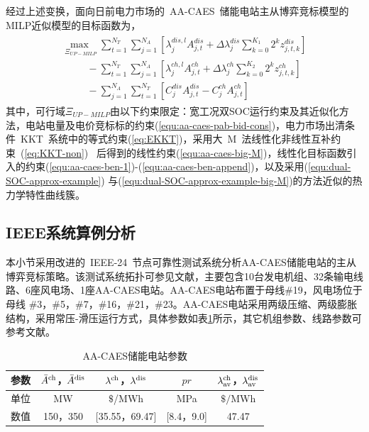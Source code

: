 经过上述变换，面向日前电力市场的~AA-CAES~储能电站主从博弈竞标模型的MILP近似模型的目标函数为，
\begin{eqnarray}
\begin{array}{l}
\mathop {\max \;}\limits_{\Xi_{UP-MILP}} \sum\limits_{t = 1}^{{N_T}} {\sum\limits_{j = 1}^{{N_A}} {[{\lambda _j^{dis,l}A_{j,t}^{dis} + \Delta \lambda _j^{dis}\sum\limits_{k = 0}^{{K_1}} {{2^k}} z_{j,t,k}^{dis}}]} } \\
\;\;\;\;\;\;\;\;\; - \sum\limits_{t = 1}^{{N_T}} {\sum\limits_{j = 1}^{{N_A}} {[{\lambda _j^{ch,l}A_{j,t}^{ch} + \Delta \lambda _j^{ch}\sum\limits_{k = 0}^{{K_2}} {{2^k}} z_{j,t,k}^{ch}}]} } \\
\;\;\;\;\;\;\;\;\; - \sum\limits_{j = 1}^{{N_A}} {\sum\limits_{t = 1}^{{N_T}} {[{C_j^{dis}A_{j,t}^{dis} - C_j^{ch}A_{j,t}^{ch}}]} }
\end{array}
\end{eqnarray}
其中，可行域$\Xi_{UP-MILP}$由以下约束限定：宽工况双SOC运行约束及其近似化方法，电站电量及电价竞标标的约束(\ref{equ:aa-caes-pab-bid-cons})，电力市场出清条件~KKT~系统中的等式约束(\ref{eq:EKKT})，采用大~M~法线性化非线性互补约束~(\ref{eq:KKT-non})~ 后得到的线性约束(\ref{equ:aa-caes-big-M})，线性化目标函数引入的约束(\ref{equ:aa-caes-ben-1})-(\ref{equ:aa-caes-ben-append})，以及采用(\ref{equ:dual-SOC-approx-example}) 与(\ref{equ:dual-SOC-approx-example-big-M})的方法近似的热力学特性曲线簇。

\subsection{IEEE系统算例分析}
本小节采用改进的~IEEE-24~节点可靠性测试系统分析AA-CAES储能电站的主从博弈竞标策略。该测试系统拓扑可参见文献，主要包含10台发电机组、32条输电线路、6座风电场、1座AA-CAES电站。AA-CAES电站布置于母线\#19，风电场位于母线 \#3，\#5，\#7，\#16，\#21，\#23。AA-CAES电站采用两级压缩、两级膨胀结构，采用常压-滑压运行方式，具体参数如表\ref{tab:AA-CAES-para}所示，其它机组参数、线路参数可参考文献。%

\begin{table}[htb]
  \centering
  \begin{minipage}[t]{0.65\linewidth} %
  \caption{AA-CAES储能电站参数}
  \label{tab:AA-CAES-para}
    \begin{tabularx}{\linewidth}{ccccc}
      \toprule[1.5pt]
    参数 & $\bar A^{\rm ch}$，$\bar A^{\rm dis}$ & $\lambda^{\rm ch}$，$\lambda^{\rm dis}$ & $pr$ & $\lambda_{\rm av}^{\rm ch}$，$\lambda_{\rm av}^{\rm dis}$ \\\midrule[1pt]
  单位 & MW & $\$$/MWh & MPa & $\$/$MWh \\
  数值 & 150，350 & [35.55，69.47] & [8.4，9.0]&  47.47 \\
      \bottomrule[1.5pt]
    \end{tabularx}
  \end{minipage}
\end{table}

